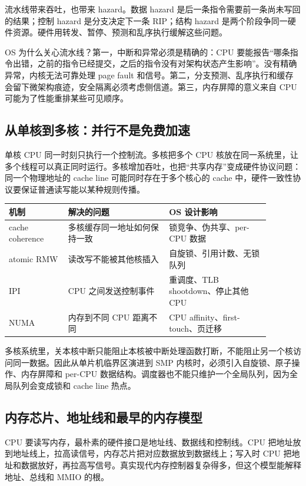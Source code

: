 流水线带来吞吐，也带来 hazard。数据 hazard 是后一条指令需要前一条尚未写回的结果；控制 hazard 是分支决定下一条 RIP；结构 hazard 是两个阶段争同一硬件资源。硬件用转发、暂停、预测和乱序执行缓解这些问题。

OS 为什么关心流水线？第一，中断和异常必须是精确的：CPU 要能报告“哪条指令出错，之前的指令已经提交，之后的指令没有对架构状态产生影响”。没有精确异常，内核无法可靠处理 page fault 和信号。第二，分支预测、乱序执行和缓存会留下微架构痕迹，安全隔离必须考虑侧信道。第三，内存屏障的意义来自 CPU 可能为了性能重排某些可见顺序。

\subsection{从单核到多核：并行不是免费加速}

单核 CPU 同一时刻只执行一个控制流。多核把多个 CPU 核放在同一系统里，让多个线程可以真正同时运行。多核增加吞吐，也把“共享内存”变成硬件协议问题：同一个物理地址的 cache line 可能同时存在于多个核心的 cache 中，硬件一致性协议要保证普通读写能以某种规则传播。

\begin{longtable}{p{0.2\linewidth}p{0.34\linewidth}p{0.34\linewidth}}
\toprule
机制 & 解决的问题 & OS 设计影响 \\
\midrule
cache coherence & 多核缓存同一地址如何保持一致 & 锁竞争、伪共享、per-CPU 数据 \\
atomic RMW & 读改写不能被其他核插入 & 自旋锁、引用计数、无锁队列 \\
IPI & CPU 之间发送控制事件 & 重调度、TLB shootdown、停止其他 CPU \\
NUMA & 内存到不同 CPU 距离不同 & CPU affinity、first-touch、页迁移 \\
\bottomrule
\end{longtable}

多核系统里，关本核中断只能阻止本核被中断处理函数打断，不能阻止另一个核访问同一数据。因此从单片机临界区演进到 SMP 内核时，必须引入自旋锁、原子操作、内存屏障和 per-CPU 数据结构。调度器也不能只维护一个全局队列，因为全局队列会变成锁和 cache line 热点。

\subsection{内存芯片、地址线和最早的内存模型}

CPU 要读写内存，最朴素的硬件接口是地址线、数据线和控制线。CPU 把地址放到地址线上，拉高读信号，内存芯片把对应数据放到数据线上；写入时 CPU 把地址和数据放好，再拉高写信号。真实现代内存控制器复杂得多，但这个模型能解释地址、总线和 MMIO 的根。


